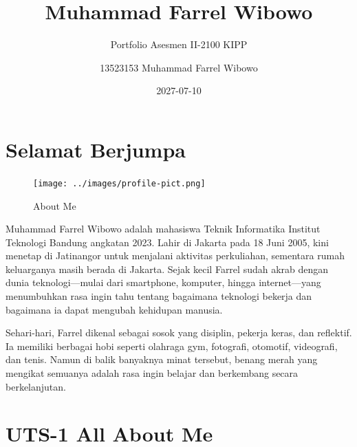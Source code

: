 \documentclass[
  letterpaper,
  DIV=11,
  numbers=noendperiod]{scrreprt}
\title{Muhammad Farrel Wibowo}
\subtitle{Portfolio Asesmen II-2100 KIPP}
\author{13523153 Muhammad Farrel Wibowo}
\date{2027-07-10}
\renewcommand*\contentsname{Table of contents}
\newcommand\contentsname{Table of contents}
\begin{document}
\maketitle

\renewcommand*\contentsname{Table of contents}
{
\hypersetup{linkcolor=}
\setcounter{tocdepth}{2}
\tableofcontents
}


\chapter*{Selamat Berjumpa}\label{selamat-berjumpa}


\begin{figure}[H]

{\centering \texttt{[image: ../images/profile-pict.png]}

}

\caption{About Me}

\end{figure}%

Muhammad Farrel Wibowo adalah mahasiswa Teknik Informatika Institut
Teknologi Bandung angkatan 2023. Lahir di Jakarta pada 18 Juni 2005,
kini menetap di Jatinangor untuk menjalani aktivitas perkuliahan,
sementara rumah keluarganya masih berada di Jakarta. Sejak kecil Farrel
sudah akrab dengan dunia teknologi---mulai dari smartphone, komputer,
hingga internet---yang menumbuhkan rasa ingin tahu tentang bagaimana
teknologi bekerja dan bagaimana ia dapat mengubah kehidupan manusia.

Sehari-hari, Farrel dikenal sebagai sosok yang disiplin, pekerja keras,
dan reflektif. Ia memiliki berbagai hobi seperti olahraga gym,
fotografi, otomotif, videografi, dan tenis. Namun di balik banyaknya
minat tersebut, benang merah yang mengikat semuanya adalah rasa ingin
belajar dan berkembang secara berkelanjutan.


\chapter{UTS-1 All About Me}\label{uts-1-all-about-me}
\end{document}
